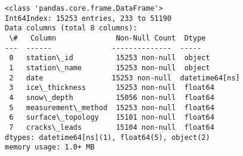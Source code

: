 \documentclass[11pt]{article}
\begin{document}
    \begin{Verbatim}[commandchars=\\\{\}]
<class 'pandas.core.frame.DataFrame'>
Int64Index: 15253 entries, 233 to 51190
Data columns (total 8 columns):
 \#   Column              Non-Null Count  Dtype
---  ------              --------------  -----
 0   station\_id          15253 non-null  object
 1   station\_name        15253 non-null  object
 2   date                15253 non-null  datetime64[ns]
 3   ice\_thickness       15253 non-null  float64
 4   snow\_depth          15056 non-null  float64
 5   measurement\_method  15253 non-null  float64
 6   surface\_topology    15101 non-null  float64
 7   cracks\_leads        15104 non-null  float64
dtypes: datetime64[ns](1), float64(5), object(2)
memory usage: 1.0+ MB
    \end{Verbatim}
\end{document}

